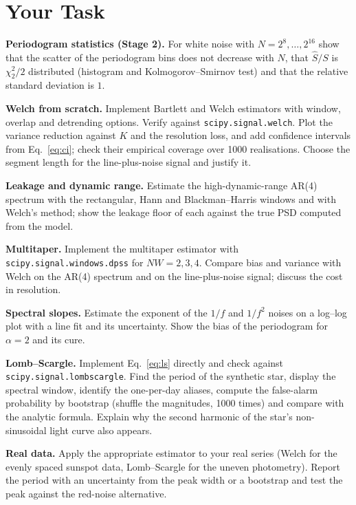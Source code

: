\documentclass[11pt,a4paper]{article}
\begin{document}
\section*{Your Task}
\begin{tasks}
  \item \textbf{Periodogram statistics (Stage 2).} For white noise with $N=2^{8},\dots,2^{16}$ show that the scatter of the periodogram bins does not decrease with $N$, that $\hat S/S$ is $\chi^2_2/2$ distributed (histogram and Kolmogorov--Smirnov test) and that the relative standard deviation is $1$.
  \item \textbf{Welch from scratch.} Implement Bartlett and Welch estimators with window, overlap and detrending options. Verify against \texttt{scipy.signal.welch}. Plot the variance reduction against $K$ and the resolution loss, and add confidence intervals from Eq.~\eqref{eq:ci}; check their empirical coverage over 1000 realisations. Choose the segment length for the line-plus-noise signal and justify it.
  \item \textbf{Leakage and dynamic range.} Estimate the high-dynamic-range AR(4) spectrum with the rectangular, Hann and Blackman--Harris windows and with Welch's method; show the leakage floor of each against the true PSD computed from the model.
  \item \textbf{Multitaper.} Implement the multitaper estimator with \texttt{scipy.signal.windows.dpss} for $NW=2,3,4$. Compare bias and variance with Welch on the AR(4) spectrum and on the line-plus-noise signal; discuss the cost in resolution.
  \item \textbf{Spectral slopes.} Estimate the exponent of the $1/f$ and $1/f^2$ noises on a log--log plot with a line fit and its uncertainty. Show the bias of the periodogram for $\alpha=2$ and its cure.
  \item \textbf{Lomb--Scargle.} Implement Eq.~\eqref{eq:ls} directly and check against \texttt{scipy.signal.lombscargle}. Find the period of the synthetic star, display the spectral window, identify the one-per-day aliases, compute the false-alarm probability by bootstrap (shuffle the magnitudes, 1000 times) and compare with the analytic formula. Explain why the second harmonic of the star's non-sinusoidal light curve also appears.
  \item \textbf{Real data.} Apply the appropriate estimator to your real series (Welch for the evenly spaced sunspot data, Lomb--Scargle for the uneven photometry). Report the period with an uncertainty from the peak width or a bootstrap and test the peak against the red-noise alternative.
\end{tasks}
\end{document}
